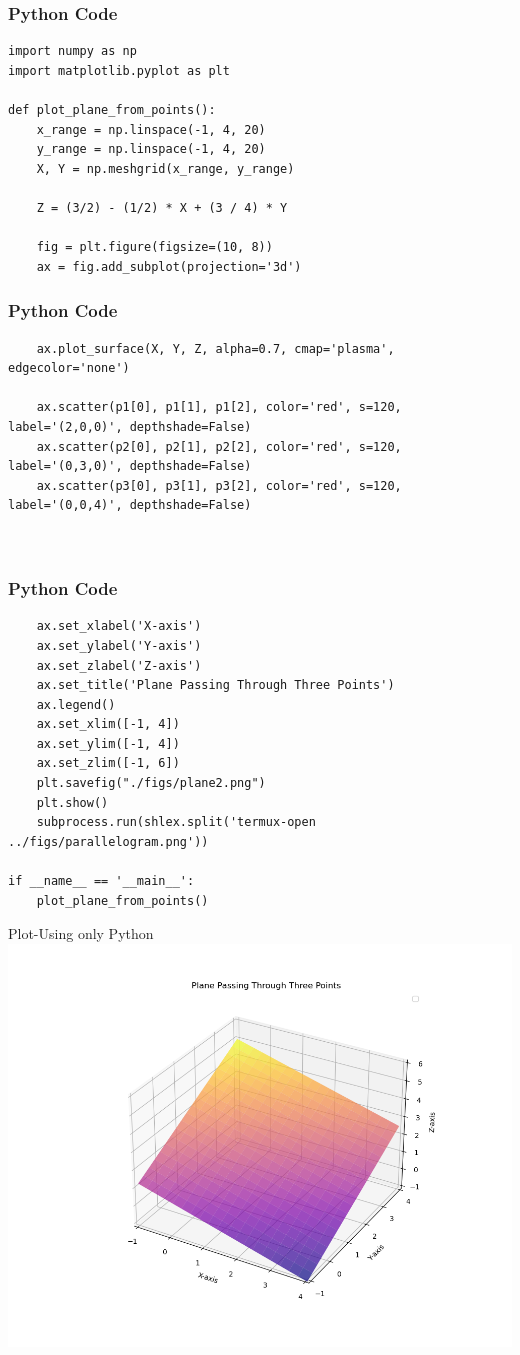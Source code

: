 \documentclass{beamer}
\begin{document}
\begin{frame}[fragile]
    \frametitle{Python Code}
    \begin{lstlisting}
import numpy as np
import matplotlib.pyplot as plt

def plot_plane_from_points():
    x_range = np.linspace(-1, 4, 20)
    y_range = np.linspace(-1, 4, 20)
    X, Y = np.meshgrid(x_range, y_range)

    Z = (3/2) - (1/2) * X + (3 / 4) * Y

    fig = plt.figure(figsize=(10, 8))
    ax = fig.add_subplot(projection='3d')

\end{lstlisting}
\end{frame}
\begin{frame}[fragile]
    \frametitle{Python Code}
    \begin{lstlisting}
    ax.plot_surface(X, Y, Z, alpha=0.7, cmap='plasma', edgecolor='none')

    ax.scatter(p1[0], p1[1], p1[2], color='red', s=120, label='(2,0,0)', depthshade=False)
    ax.scatter(p2[0], p2[1], p2[2], color='red', s=120, label='(0,3,0)', depthshade=False)
    ax.scatter(p3[0], p3[1], p3[2], color='red', s=120, label='(0,0,4)', depthshade=False)



\end{lstlisting}
\end{frame}
\begin{frame}[fragile]
    \frametitle{Python Code}
    \begin{lstlisting}
    ax.set_xlabel('X-axis')
    ax.set_ylabel('Y-axis')
    ax.set_zlabel('Z-axis')
    ax.set_title('Plane Passing Through Three Points')
    ax.legend()
    ax.set_xlim([-1, 4])
    ax.set_ylim([-1, 4])
    ax.set_zlim([-1, 6])
    plt.savefig("./figs/plane2.png")
    plt.show()
    subprocess.run(shlex.split('termux-open ../figs/parallelogram.png'))

if __name__ == '__main__':
    plot_plane_from_points()
\end{lstlisting}
\end{frame}



\begin{frame}{Plot-Using only Python}
    \centering
    \includegraphics[width=\columnwidth, height=0.8\textheight, keepaspectratio]{figs/plane2.png}     
\end{frame}
\end{document}
